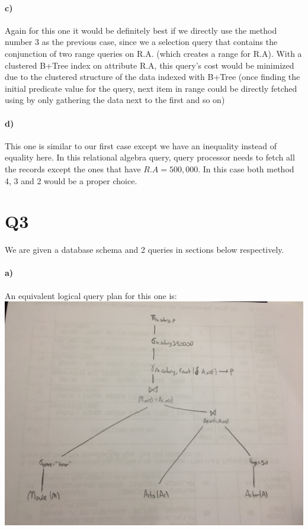 \documentclass[a4paper,12pt]{article}
\begin{document}
\paragraph{c)} Again for this one it would be definitely best if we directly use the method number 3 as the previous case, since we a selection query that contains the conjunction of two range queries on R.A. (which creates a range for R.A). With a clustered B+Tree index on attribute R.A, this query's cost would be minimized due to the clustered structure of the data indexed with B+Tree (once finding the initial predicate value for the query, next item in range could be directly fetched using by only gathering the data next to the first and so on)

\paragraph{d)} This one is similar to our first case except we have an inequality instead of equality here. In this relational algebra query, query processor needs to fetch all the records except the ones that have $R.A = 500,000$. In this case both method 4, 3 and 2 would be a proper choice.  

\newpage
\section{Q3}

We are given a database schema and 2 queries in sections below respectively.

\paragraph{a)} An equivalent logical query plan for this one is: \\
\includegraphics[scale=0.125]{IMG_2456.JPG}
\end{document}
